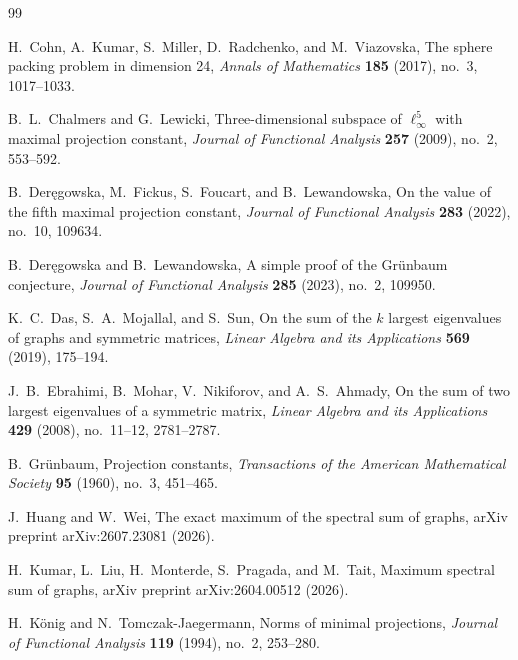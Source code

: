 \documentclass[UTF8,11pt]{ctexart}
\theoremstyle{definition}
\begin{document}
\begin{thebibliography}{99}
\small

H.~Cohn, A.~Kumar, S.~Miller, D.~Radchenko, and M.~Viazovska,
\newblock The sphere packing problem in dimension 24,
\newblock \textit{Annals of Mathematics} \textbf{185} (2017), no.~3, 1017--1033.

B.~L.~Chalmers and G.~Lewicki,
\newblock Three-dimensional subspace of $\ell_\infty^5$ with maximal projection constant,
\newblock \textit{Journal of Functional Analysis} \textbf{257} (2009), no.~2, 553--592.

B.~Der\k{e}gowska, M.~Fickus, S.~Foucart, and B.~Lewandowska,
\newblock On the value of the fifth maximal projection constant,
\newblock \textit{Journal of Functional Analysis} \textbf{283} (2022), no.~10, 109634.

B.~Der\k{e}gowska and B.~Lewandowska,
\newblock A simple proof of the Gr\"unbaum conjecture,
\newblock \textit{Journal of Functional Analysis} \textbf{285} (2023), no.~2, 109950.

K.~C.~Das, S.~A.~Mojallal, and S.~Sun,
\newblock On the sum of the $k$ largest eigenvalues of graphs and symmetric matrices,
\newblock \textit{Linear Algebra and its Applications} \textbf{569} (2019), 175--194.

J.~B.~Ebrahimi, B.~Mohar, V.~Nikiforov, and A.~S.~Ahmady,
\newblock On the sum of two largest eigenvalues of a symmetric matrix,
\newblock \textit{Linear Algebra and its Applications} \textbf{429} (2008), no.~11--12, 2781--2787.

B.~Gr\"unbaum,
\newblock Projection constants,
\newblock \textit{Transactions of the American Mathematical Society} \textbf{95} (1960), no.~3, 451--465.

J.~Huang and W.~Wei,
\newblock The exact maximum of the spectral sum of graphs,
\newblock arXiv preprint arXiv:2607.23081 (2026).

H.~Kumar, L.~Liu, H.~Monterde, S.~Pragada, and M.~Tait,
\newblock Maximum spectral sum of graphs,
\newblock arXiv preprint arXiv:2604.00512 (2026).

H.~K\"onig and N.~Tomczak-Jaegermann,
\newblock Norms of minimal projections,
\newblock \textit{Journal of Functional Analysis} \textbf{119} (1994), no.~2, 253--280.


\end{thebibliography}
\end{document}

